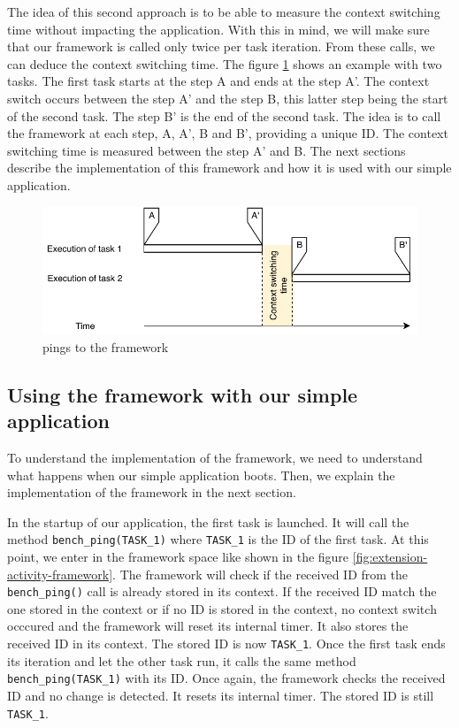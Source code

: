 The idea of this second approach is to be able to measure the context switching time without impacting the application.
With this in mind, we will make sure that our framework is called only twice per task iteration.
From these calls, we can deduce the context switching time.
The figure \ref{fig:internal-framework-ping} shows an example with two tasks.
The first task starts at the step A and ends at the step A'.
The context switch occurs between the step A' and the step B, this latter step being the start of the second task.
The step B' is the end of the second task.
The idea is to call the framework at each step, A, A', B and B', providing a unique ID.
The context switching time is measured between the step A' and B.
The next sections describe the implementation of this framework and how it is used with our simple application.

\begin{figure}[!ht]
  \centering
  \includegraphics[scale=1]{assets/internal-framework-ping.pdf}
  \caption{\label{fig:internal-framework-ping}pings to the framework}
\end{figure}

\subsection{Using the framework with our simple application}

To understand the implementation of the framework, we need to understand what happens when our simple application boots. 
Then, we explain the implementation of the framework in the next section.

In the startup of our application, the first task is launched.
It will call the method \texttt{bench\_ping(TASK\_1)} where \texttt{TASK\_1} is the ID of the first task.
At this point, we enter in the framework space like shown in the figure \ref{fig:extension-activity-framework}.
The framework will check if the received ID from the \texttt{bench\_ping()} call is already stored in its context.
If the received ID match the one stored in the context or if no ID is stored in the context, no context switch occcured and the framework will reset its internal timer.
It also stores the received ID in its context.
The stored ID is now \texttt{TASK\_1}.
Once the first task ends its iteration and let the other task run, it calls the same method \texttt{bench\_ping(TASK\_1)} with its ID.
Once again, the framework checks the received ID and no change is detected.
It resets its internal timer.
The stored ID is still \texttt{TASK\_1}.

